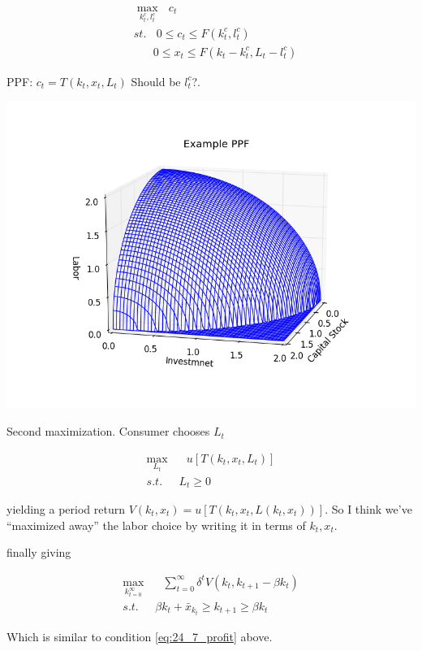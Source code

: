 \documentclass[11pt]{article}
\begin{document}
  \begin{align}
    &\max_{k^c_t, l^c_t}  \ \ \ c_t\\
    &st. \ \ \ \ 0 \leq c_t \leq F(k_t^c, l_t^c)\\
    & \ \ \ \, \ \ \ \ 0 \leq x_t \leq F(k_t - k_t^c, L_t - l_t^c)
  \end{align}

  PPF: $c_t = T(k_t, x_t, L_t)$ Should be $l^c_t$?.
  \begin{center}
    \includegraphics[scale=.31]{example_ppf_wire.png}
    \label{fig:ppf}
  \end{center}

  Second maximization.  Consumer chooses $L_t$

  \begin{align}
    \max_{L_t} & \ \ \  u[T(k_t, x_t, L_t)] \\
    s.t. \ \ \ & L_t \geq 0
  \end{align}

  yielding a period return $V(k_t, x_t) = u[T(k_t, x_t, L(k_t, x_t))]$.  So I think we've ``maximized away'' the labor choice by writing it in terms of $k_t, x_t$.

  finally giving

  \begin{align}
    \max_{k_{t=0}^\infty} & \ \ \ \sum_{t=0}^{\infty} \delta^t V(k_t, k_{t+1} - \beta k_t)\\
    s.t. \ \ \ & \beta k_t + \bar{x}_{k_t} \geq k_{t+1} \geq \beta k_t
  \end{align}

  Which is similar to condition \ref{eq:24_7_profit} above.
  
\end{document}
